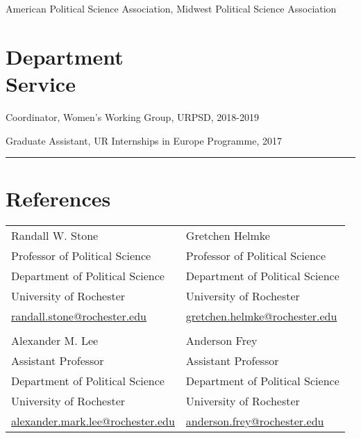 \documentclass[margin,line,12pt]{res}
\begin{document}
\begin{resume}
American Political Science Association, Midwest Political Science Association 

\section{\sc Department \\ Service}

Coordinator, Women's Working Group,  URPSD,  2018-2019
\vspace*{-4.5mm}

Graduate Assistant, UR Internships in Europe Programme,  2017

\begin{center}
	\noindent\rule{8cm}{0.4pt}
\end{center}
\vspace{2em}

\section{\sc References}
\hskip 18pt
\begin{tabular}{ll}
	Randall W. Stone                   & Gretchen Helmke  \\
	Professor of Political Science              & Professor of Political Science\\
	Department of Political Science     & Department of Political Science  \\
	University of Rochester             & University of Rochester \\
\href{mailto:randall.stone@rochester.edu}{randall.stone@rochester.edu}& \href{mailto:gretchen.helmke@rochester.edu}{gretchen.helmke@rochester.edu}\\
\\
	Alexander M. Lee                     & Anderson Frey  \\
	Assistant Professor                 & Assistant Professor\\
	Department of Political Science     & Department of Political Science  \\
	University of Rochester             & University of Rochester \\
 \href{mailto:alexander.mark.lee@rochester.edu}{alexander.mark.lee@rochester.edu}&
 	\href{mailto:anderson.frey@rochester.edu}{anderson.frey@rochester.edu}\\
\end{tabular}



\thispagestyle{updated}

\end{resume}
\end{document}
